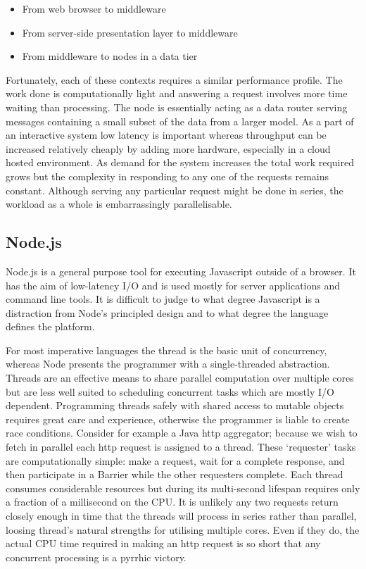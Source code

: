 \documentclass[12pt, ]{article}
\begin{document}
\begin{itemize}
\itemsep1pt\parskip0pt
\item
  From web browser to middleware
\item
  From server-side presentation layer to middleware
\item
  From middleware to nodes in a data tier
\end{itemize}

Fortunately, each of these contexts requires a similar performance
profile. The work done is computationally light and answering a request
involves more time waiting than processing. The node is essentially
acting as a data router serving messages containing a small subset of
the data from a larger model. As a part of an interactive system low
latency is important whereas throughput can be increased relatively
cheaply by adding more hardware, especially in a cloud hosted
environment. As demand for the system increases the total work required
grows but the complexity in responding to any one of the requests
remains constant. Although serving any particular request might be done
in series, the workload as a whole is embarrassingly parallelisable.

\subsection{Node.js}\label{node.js}

Node.js is a general purpose tool for executing Javascript outside of a
browser. It has the aim of low-latency I/O and is used mostly for server
applications and command line tools. It is difficult to judge to what
degree Javascript is a distraction from Node's principled design and to
what degree the language defines the platform.

For most imperative languages the thread is the basic unit of
concurrency, whereas Node presents the programmer with a single-threaded
abstraction. Threads are an effective means to share parallel
computation over multiple cores but are less well suited to scheduling
concurrent tasks which are mostly I/O dependent. Programming threads
safely with shared access to mutable objects requires great care and
experience, otherwise the programmer is liable to create race
conditions. Consider for example a Java http aggregator; because we wish
to fetch in parallel each http request is assigned to a thread. These
`requester' tasks are computationally simple: make a request, wait for a
complete response, and then participate in a Barrier while the other
requesters complete. Each thread consumes considerable resources but
during its multi-second lifespan requires only a fraction of a
millisecond on the CPU. It is unlikely any two requests return closely
enough in time that the threads will process in series rather than
parallel, loosing thread's natural strengths for utilising multiple
cores. Even if they do, the actual CPU time required in making an http
request is so short that any concurrent processing is a pyrrhic victory.
\end{document}
